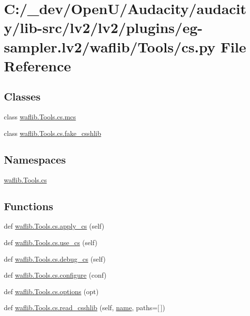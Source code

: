 \hypertarget{lv2_2plugins_2eg-sampler_8lv2_2waflib_2_tools_2cs_8py}{}\section{C\+:/\+\_\+dev/\+Open\+U/\+Audacity/audacity/lib-\/src/lv2/lv2/plugins/eg-\/sampler.lv2/waflib/\+Tools/cs.py File Reference}
\label{lv2_2plugins_2eg-sampler_8lv2_2waflib_2_tools_2cs_8py}
\subsection*{Classes}
\begin{DoxyCompactItemize}
\item 
class \hyperlink{classwaflib_1_1_tools_1_1cs_1_1mcs}{waflib.\+Tools.\+cs.\+mcs}
\item 
class \hyperlink{classwaflib_1_1_tools_1_1cs_1_1fake__csshlib}{waflib.\+Tools.\+cs.\+fake\+\_\+csshlib}
\end{DoxyCompactItemize}
\subsection*{Namespaces}
\begin{DoxyCompactItemize}
\item 
 \hyperlink{namespacewaflib_1_1_tools_1_1cs}{waflib.\+Tools.\+cs}
\end{DoxyCompactItemize}
\subsection*{Functions}
\begin{DoxyCompactItemize}
\item 
def \hyperlink{namespacewaflib_1_1_tools_1_1cs_a27e68865096cf54da13a1d0d563bd4c2}{waflib.\+Tools.\+cs.\+apply\+\_\+cs} (self)
\item 
def \hyperlink{namespacewaflib_1_1_tools_1_1cs_a2962c0e94d37d4610f58b0e4911fbd9f}{waflib.\+Tools.\+cs.\+use\+\_\+cs} (self)
\item 
def \hyperlink{namespacewaflib_1_1_tools_1_1cs_ae5dd9312be558c0712218cdab22724b4}{waflib.\+Tools.\+cs.\+debug\+\_\+cs} (self)
\item 
def \hyperlink{namespacewaflib_1_1_tools_1_1cs_a97849d425e4332772dd4982ae091360f}{waflib.\+Tools.\+cs.\+configure} (conf)
\item 
def \hyperlink{namespacewaflib_1_1_tools_1_1cs_a20f520fa6e5a8eb6b064f7c5c82be0e0}{waflib.\+Tools.\+cs.\+options} (opt)
\item 
def \hyperlink{namespacewaflib_1_1_tools_1_1cs_aa175024b17365922ae423f6846c3ca7f}{waflib.\+Tools.\+cs.\+read\+\_\+csshlib} (self, \hyperlink{lib_2expat_8h_a1b49b495b59f9e73205b69ad1a2965b0}{name}, paths=\mbox{[}$\,$\mbox{]})
\end{DoxyCompactItemize}
